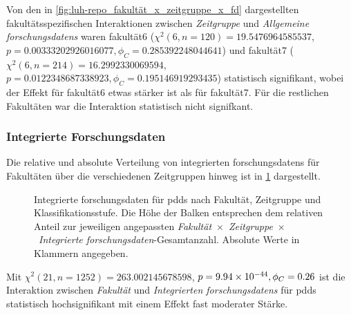 Von den in \cref{fig:luh-repo_fakultät_x_zeitgruppe_x_fd} dargestellten fakultätsspezifischen Interaktionen zwischen \textit{Zeitgruppe} und \textit{Allgemeine \glspl{forschungsdaten}} waren \gls{fakultät6} ($\chi^2 (\num{6}, n=\num{120}) = \num[round-mode=places,round-precision=2]{19.5476964585537}$, $p = \num[round-mode=places,round-precision=3]{0.00333202926016077},\phi_C=\num[round-mode=places,round-precision=2]{0.285392248044641}$) und \gls{fakultät7} ($\chi^2 (\num{6}, n=\num{214}) = \num[round-mode=places,round-precision=2]{16.2992330069594}$, $p = \num[round-mode=places,round-precision=2]{0.0122348687338923},\phi_C=\num[round-mode=places,round-precision=2]{0.195146919293435}$) statistisch signifikant, wobei der Effekt für \gls{fakultät6} etwas stärker ist als für \gls{fakultät7}.
Für die restlichen Fakultäten war die Interaktion statistisch nicht signifkant.

\subsubsection{Integrierte Forschungsdaten}
Die relative und absolute Verteilung von integrierten \glspl{forschungsdaten} für Fakultäten über die verschiedenen Zeitgruppen hinweg ist in \cref{fig:luh-repo_fakultät_x_zeitgruppe_x_intern-fd} dargestellt.
\begin{figure}[!htbp]
    \resizebox{\ifdim\width>\textwidth\textwidth\else\width\fi}{!}{}
    \caption{Integrierte \gls{forschungsdaten} für \glspl{pdd} nach Fakultät, Zeitgruppe und Klassifikationsstufe.
    Die Höhe der Balken entsprechen dem relativen Anteil zur jeweiligen angepassten \textit{Fakultät}~$\times$~\textit{Zeitgruppe}~$\times$~\textit{Integrierte \gls{forschungsdaten}}-Gesamtanzahl.
    Absolute Werte in Klammern angegeben.}
    \label{fig:luh-repo_fakultät_x_zeitgruppe_x_intern-fd}
\end{figure}
Mit $\chi^2 (\num{21}, n=\num{1252}) = \num[round-mode=places,round-precision=2]{263.002145678598}$, $p = \num[round-mode=places,round-precision=2]{9.94476930299567E-44},\phi_C=\num[round-mode=places,round-precision=2]{0.264616459279196}$ ist die Interaktion zwischen \textit{Fakultät} und \textit{Integrierten \glspl{forschungsdaten}} für \glspl{pdd} statistisch hochsignifikant mit einem Effekt fast moderater Stärke.


